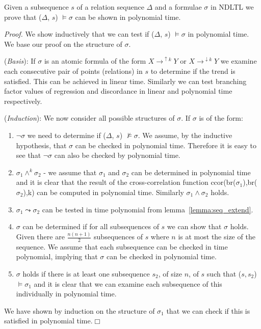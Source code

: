 \begin{theorem}
\begin{rm}
Given a subsequence $s$ of a relation sequence $\Delta$ and a formulae $\sigma$ in NDLTL
we prove that ($\Delta$, $s$) $\models \sigma$ can be shown in
 polynomial time.
\end{rm}
\end{theorem}

\smallskip

{\em Proof.} We show inductively that we can test if  
($\Delta$, $s$) $\models \sigma$ in
polynomial time. We base our proof on the structure of $\sigma$.

\smallskip
({\em Basis}): If $\sigma$ is an atomic formula of the form $X
\to^{\uparrow{k}} Y$ or  $X \to^{\downarrow{k}} Y$ we
examine each consecutive pair of points (relations) in $s$ to determine if the trend
is satisfied. This can be achieved in linear time. Similarly we can
test branching factor values of regression and discordance in linear
and polynomial time respectively.

\smallskip
({\em Induction}): We now consider all possible structures of
$\sigma$. If $\sigma$ is of the form:
\begin{enumerate}
\item $\neg \sigma$  we need to determine if ($\Delta$, $s$)
$\not\models \sigma$. We assume, by the inductive hypothesis, that
$\sigma$ can be checked in polynomial time. Therefore it is easy to
see that $\neg \sigma$ can also be checked by polynomial time.
\item $\sigma_1 \wedge^k \sigma_2$ - we assume that $\sigma_1$ and
$\sigma_2$ can be determined in polynomial time and it is clear that
the result of the cross-correlation function
ccor(br($\sigma_1$),br($\sigma_2$),k) can be computed in polynomial
time. Similarly $\sigma_1 \wedge \sigma_2$ holds.
\item $\sigma_1 \leadsto \sigma_2$ can be tested in time polynomial
from lemma~\ref{lemma:seq_extend}.  
\item {} $\sigma$ can be determined if for all subsequences of $s$
we can show that $\sigma$ holds.  Given  there
are $\frac{n(n+1)}{2}$ subsequences of $s$ where $n$ is at most the
size of the sequence. We assume that each
subsequence can be checked in time polynomial, implying that 
$\sigma$ can be checked in polynomial time.
\item {} $\sigma$ holds if there is at least one subsequence
$s_2$, of size $n$,
of $s$ such that ($s, s_2$) $\models \sigma_1$ and it is clear
that we can examine each subsequence of this individually in
polynomial time.
\end{enumerate}
We have shown by induction on the structure of $\sigma_1$ that we can
check if this is satisfied in polynomial time.$\Box$
 

